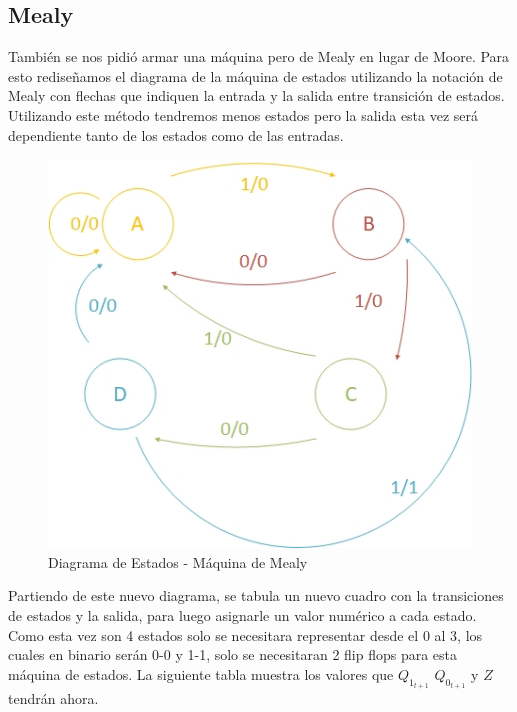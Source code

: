 \documentclass[10pt,a4paper]{article}
\begin{document}
\subsection{Mealy}

También se nos pidi\'o armar una m\'aquina pero de Mealy en lugar de Moore. Para esto rediseñamos el diagrama de la máquina de estados utilizando la notaci\'on de Mealy con flechas que indiquen la entrada y la salida entre transición de estados. Utilizando este método tendremos menos estados pero la salida esta vez será dependiente tanto de los estados como de las entradas.

\begin{figure}[H]
	\centering
	\includegraphics[scale=0.6]{diagestmealy.jpg}
	\caption{Diagrama de Estados - Máquina de Mealy}
	\label{2_fig7}
\end{figure}

Partiendo de este nuevo diagrama, se tabula un nuevo cuadro con la transiciones de estados y la salida, para luego asignarle un valor numérico a cada estado. Como esta vez son 4 estados solo se necesitara representar desde el 0 al 3, los cuales en binario serán 0-0 y 1-1, solo se necesitaran 2 flip flops para esta máquina de estados. La siguiente tabla muestra los valores que $Q_{1_{t+1}}$ $Q_{0_{t+1}}$ y $Z$ tendrán ahora.
\end{document}

